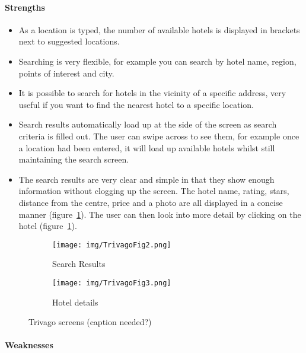 
\paragraph{Strengths}

\begin{itemize}
	\item As a location is typed, the number of available hotels is displayed
		in brackets next to suggested locations.
	\item Searching is very flexible, for example you can search by hotel name,
		region, points of interest and city.
	\item It is possible to search for hotels in the vicinity of a specific
		address, very useful if you want to find the nearest hotel to a
		specific location.
	\item Search results automatically load up at the side of the screen as
		search criteria is filled out. The user can swipe across to see them,
		for example once a location had been entered, it will load up available
		hotels whilst still maintaining the search screen.
	\item The search results are very clear and simple in that they show enough
		information without clogging up the screen. The hotel name, rating,
		stars, distance from the centre, price and a photo are all displayed in
		a concise manner (figure~\ref{fig:trivago2}). The user can then look
		into more detail by clicking on the hotel (figure~\ref{fig:trivago2}).
\end{itemize}

\begin{figure}[ht]
    \centering
    \begin{subfigure}[b]{0.2\textwidth}
        \texttt{[image: img/TrivagoFig2.png]}
        \caption{Search Results}
    \end{subfigure}%
    \qquad
    \begin{subfigure}[b]{0.2\textwidth}
        \texttt{[image: img/TrivagoFig3.png]}
        \caption{Hotel details}
    \end{subfigure}
    \caption{Trivago screens (caption needed?)}\label{fig:trivago2}
\end{figure}


\paragraph{Weaknesses}

